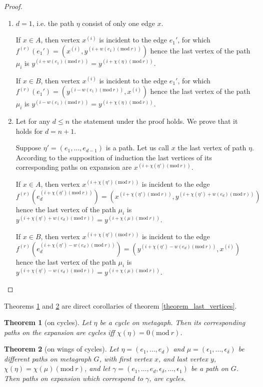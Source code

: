 \documentclass[leqno]{aadmbook}
\newtheorem{theorem}{Theorem}
\renewcommand{\mod}[1]{\textrm{mod}\ #1}
\begin{document}
\begin{section}
\begin{proof}
    \begin{enumerate}
    \item $d = 1$, i.e. the path $\eta$ consist of only one edge $x$.
    
    If $x \in A$, then vertex $x^{(i)}$ is incident to the edge $e_1'$, for which $f^{(r)}(e_1') = (x^{(i)}, y^{(i + w(e_1) (\mod{r}))})$ hence the last vertex of the path $\mu_i$ is $y^{(i + w(e_1) (\mod{r}))} = y^{(i + \chi(\eta) (\mod{r}))}$.
    
    If $x \in B$, then vertex $x^{(i)}$ is incident to the edge $e_1'$, for which $f^{(r)}(e_1') = (y^{(i - w(e_1) (\mod{r}))}, x^{(i)})$ hence the last vertex of the path $\mu_i$ is $y^{(i - w(e_1) (\mod{r}))} = y^{(i + \chi(\eta) (\mod{r}))}$.
    
    \item Let for any $d \leq n$ the statement under the proof holds. We prove that it holds for $d = n + 1$.

    Suppose $\eta' = (e_1, ..., e_{d - 1})$ is a path. Let us call $x$ the last vertex of path $\eta$. According to the supposition of induction the last vertices of its corresponding paths on expansion are $x^{(i + \chi(\eta')(\mod{r}))}$.
    
    If $x \in A$, then vertex $x^{(i + \chi(\eta')(\mod{r}))}$ is incident to the edge $f^{(r)}(e_d^{(i + \chi(\eta')(\mod{r}))}) = (x^{(i + \chi(\eta')(\mod{r}))}, y^{(i + \chi(\eta') + w(e_d) (\mod{r}))})$ hence the last vertex of the path $\mu_i$ is $y^{(i + \chi(\eta') + w(e_d) (\mod{r}))} = y^{(i + \chi(\mu) (\mod{r}))}$.
    
    If $x \in B$, then vertex $x^{(i + \chi(\eta')(\mod{r}))}$ is incident to the edge $f^{(r)}(e_d^{(i + \chi(\eta') - w(e_d) (\mod{r}))}) = (y^{(i + \chi(\eta') - w(e_d) (\mod{r}))}, x^{(i)})$ hence the last vertex of the path $\mu_i$ is $y^{(i + \chi(\eta') - w(e_d) (\mod{r}))} = y^{(i + \chi(\mu) (\mod{r}))}$.  
    
    \end{enumerate}  
\end{proof}

Theorems \ref{theorem_cycles} and \ref{theorem_wings} are direct corollaries of theorem \ref{theorem_last_vertices}.

\begin{theorem}[on cycles]\label{theorem_cycles}
    Let $\eta$ be a cycle on metagaph. Then its corresponding paths on the expansion are cycles iff $\chi(\eta) = 0 (\mod{r})$.
\end{theorem}

\begin{theorem}[on wings of cycles]\label{theorem_wings}
    Let $\eta = (e_1, ..., e_d)$ and $\mu = (\epsilon_1, ..., \epsilon_{\delta})$ be different paths on metagraph $G$, with first vertex $x$, and last vertex $y$, $\chi(\eta) = \chi(\mu) (\mod{r})$, and let $\gamma = (e_1, \dots, e_d, \epsilon_{\delta}, \dots, \epsilon_1)$ be a path on $G$. Then paths on expansion which correspond to $\gamma$, are cycles.
\end{theorem}

\end{section}
\end{document}
